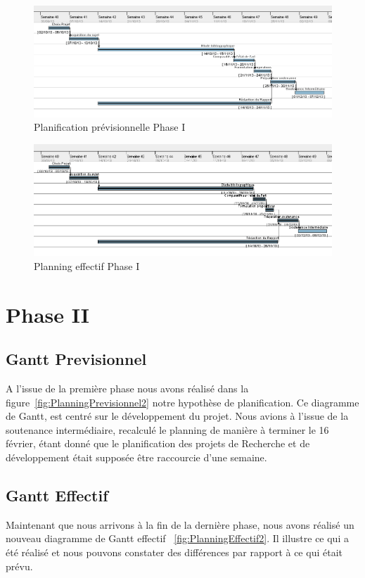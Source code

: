 \documentclass[11pt, french]{report-rd-info}
\begin{document}
\begin{figure}
	\centering
		\includegraphics[width=1\textwidth]{Gantts/p1_previsionnel}
	\caption{Planification prévisionnelle Phase I}
	\label{fig:PlanningPrevisionnel}
\end{figure}
\begin{figure}
	\centering
		\includegraphics[width=1\textwidth]{Gantts/p1_effectif}
	\caption{Planning effectif Phase I}
	\label{fig:PlanningEffectif}
\end{figure}



\section{Phase II}
\subsection{Gantt Previsionnel}
A l'issue de la première phase nous avons réalisé dans la figure~\ref{fig:PlanningPrevisionnel2} notre hypothèse de planification. Ce diagramme de Gantt, est centré sur le développement du projet. Nous avions à l'issue de la soutenance intermédiaire, recalculé le planning de manière à terminer le 16 février, étant donné que le planification des projets de Recherche et de développement était supposée être raccourcie d'une semaine. 

\subsection{Gantt Effectif}
Maintenant que nous arrivons à la fin de la dernière phase, nous avons réalisé un nouveau diagramme de Gantt effectif ~\ref{fig:PlanningEffectif2}. Il illustre ce qui a été réalisé et nous pouvons constater des différences par rapport à ce qui était prévu.
\end{document}
